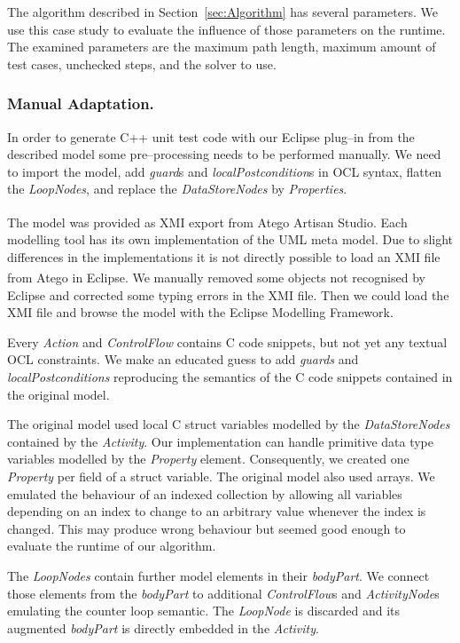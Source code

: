 \documentclass[runningheads,a4paper]{llncs}%
\newcommand{\UMLType}[1]{\textsf{\textit{#1}}} %
\newcommand{\UMLReference}[1]{\textsf{\textit{#1}}} %
\begin{document}
The algorithm described in Section~\ref{sec:Algorithm} has several parameters.
We use this case study to evaluate the influence of those parameters on the
runtime. The examined parameters are the maximum path length, maximum amount of
test cases, unchecked steps, and the solver to use.
\subsubsection{Manual Adaptation.}
In order to generate C++ unit test code with our Eclipse plug--in from the
described model some pre--processing needs to be performed manually. We need to
import the model, add \UMLReference{guard}s and
\UMLReference{localPostcondition}s in OCL syntax, flatten the
\UMLType{LoopNodes}, and replace the \UMLType{DataStoreNodes} by
\UMLType{Properties}.

The model was provided as XMI export from Atego\textsuperscript{\textregistered}
Artisan Studio. Each modelling tool has its own implementation of the UML meta
model. Due to slight differences in the implementations it is not directly
possible to load an XMI file from Atego\textsuperscript{\textregistered} in
Eclipse. We manually removed some objects not recognised by Eclipse and
corrected some typing errors in the XMI file. Then we could load the XMI file
and browse the model with the Eclipse Modelling Framework.

Every \UMLType{Action} and \UMLReference{ControlFlow} contains C code snippets,
but not yet any textual OCL constraints. We make an educated guess to add
\UMLReference{guards} and \UMLReference{localPostconditions} reproducing the
semantics of the C code snippets contained in the original model.

The original model used local C struct variables modelled by the
\UMLType{DataStoreNodes} contained by the \UMLType{Activity}. Our implementation
can handle primitive data type variables modelled by the \UMLType{Property}
element. Consequently, we created one \UMLType{Property} per field of a struct
variable. The original model also used arrays. We emulated the behaviour of an
indexed collection by allowing all variables depending on an index to change to
an arbitrary value whenever the index is changed. This may produce wrong
behaviour but seemed good enough to evaluate the runtime of our algorithm.

The \UMLType{LoopNodes} contain further model elements in their
\UMLReference{bodyPart}. We connect those elements from the
\UMLReference{bodyPart} to additional \UMLType{ControlFlow}s and
\UMLType{ActivityNode}s emulating the counter loop semantic. The
\UMLType{LoopNode} is discarded and its augmented \UMLReference{bodyPart} is
directly embedded in the \UMLType{Activity}.
\end{document}
